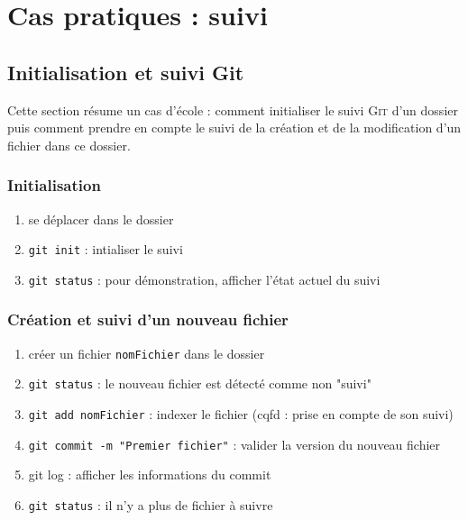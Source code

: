 \documentclass[11pt,twoside,headings=normal,open=right,french,DIV=12]{scrreprt}
\newcommand{\git}{\textsc{Git}}
\newcommand{\img}[2]{\texttt{[image: \#2]}}
\newcommand{\info}[1]{
    \begin{minipage}{\textwidth}
	    \begin{minipage}[c]{0.1\linewidth}
		    \centering\img{0.1}{../images/info}
        \end{minipage}    
		\begin{minipage}[c]{0.8\linewidth}
		    #1
        \end{minipage}
    \end{minipage}
	}
\begin{document}
\chapter{Cas pratiques : suivi}



\section{Initialisation et suivi Git}



Cette section résume un cas d'école : comment initialiser le suivi \git{} d'un dossier puis comment prendre en compte le suivi de la création et de la modification d'un fichier dans ce dossier.




\subsection{Initialisation}



\begin{enumerate}
\item se déplacer dans le dossier
\item \verb|git init| : intialiser le suivi
\item \verb|git status|  : pour démonstration, afficher l'état actuel du suivi 
\end{enumerate}



\subsection{Création et suivi d'un nouveau fichier}



\begin{enumerate}
\item créer un fichier \verb|nomFichier| dans le dossier
\item \verb|git status|  : le nouveau fichier est détecté comme non "suivi"
\item \verb|git add nomFichier| : indexer le fichier (cqfd : prise en compte de son suivi)
\item \verb|git commit -m "Premier fichier"| : valider la version du nouveau fichier
\item git log : afficher les informations du commit 
\item \verb|git status|  : il n'y a plus de fichier à suivre
\end{enumerate}
\end{document}
